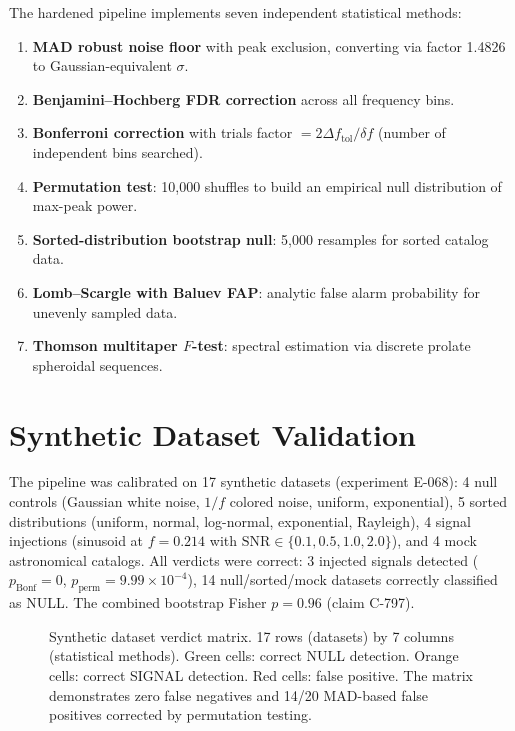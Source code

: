 \documentclass[12pt,openany]{report}
\theoremstyle{definition}
\theoremstyle{plain}
\theoremstyle{remark}
\begin{document}
The hardened pipeline implements seven independent statistical methods:
\begin{enumerate}
  \item \textbf{MAD robust noise floor} with peak exclusion, converting
    via factor 1.4826 to Gaussian-equivalent $\sigma$.
  \item \textbf{Benjamini--Hochberg FDR correction} across all
    frequency bins.
  \item \textbf{Bonferroni correction} with trials factor
    $= 2\Delta f_{\mathrm{tol}}/\delta f$ (number of independent bins searched).
  \item \textbf{Permutation test}: 10,000 shuffles to build an
    empirical null distribution of max-peak power.
  \item \textbf{Sorted-distribution bootstrap null}: 5,000 resamples
    for sorted catalog data.
  \item \textbf{Lomb--Scargle with Baluev FAP}: analytic false alarm
    probability for unevenly sampled data.
  \item \textbf{Thomson multitaper $F$-test}: spectral estimation via
    discrete prolate spheroidal sequences.
\end{enumerate}

\section{Synthetic Dataset Validation}

The pipeline was calibrated on 17 synthetic datasets (experiment E-068):
4 null controls (Gaussian white noise, $1/f$ colored noise, uniform,
exponential), 5 sorted distributions (uniform, normal, log-normal,
exponential, Rayleigh), 4 signal injections (sinusoid at $f = 0.214$
with $\mathrm{SNR} \in \{0.1, 0.5, 1.0, 2.0\}$), and 4 mock
astronomical catalogs.  All verdicts were correct: 3 injected signals
detected ($p_{\mathrm{Bonf}} = 0$, $p_{\mathrm{perm}} = 9.99 \times
10^{-4}$), 14 null/sorted/mock datasets correctly classified as NULL.
The combined bootstrap Fisher $p = 0.96$ (claim C-797).

\begin{figure}[htbp]
\centering

\caption{Synthetic dataset verdict matrix.  17 rows (datasets) by 7
columns (statistical methods).  Green cells: correct NULL detection.
Orange cells: correct SIGNAL detection.  Red cells: false positive.
The matrix demonstrates zero false negatives and 14/20 MAD-based
false positives corrected by permutation testing.}
\label{fig:verdict-matrix}
\end{figure}
\end{document}
